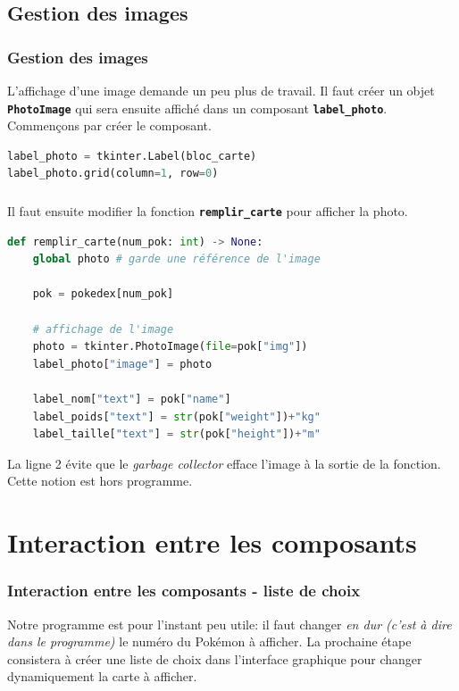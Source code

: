 \documentclass[svgnames,11pt]{beamer}
\begin{document}
\subsection{Gestion des images}
\begin{frame}[fragile]
    \frametitle{Gestion des images}

    L'affichage d'une image demande un peu plus de travail. Il faut créer un objet \textbf{\texttt{PhotoImage}} qui sera ensuite affiché dans un composant \textbf{\texttt{label\_photo}}. Commençons par créer le composant.
    \begin{center}
        \begin{lstlisting}[language=Python , basicstyle=\ttfamily\small, xleftmargin=1em, xrightmargin=1em]
label_photo = tkinter.Label(bloc_carte)
label_photo.grid(column=1, row=0)  
\end{lstlisting}
        \label{CODE}
    \end{center}

\end{frame}

\begin{frame}[fragile]
    \frametitle{}

    Il faut ensuite modifier la fonction \textbf{\texttt{remplir\_carte}} pour afficher la photo.

    \begin{center}
        \begin{lstlisting}[language=Python , basicstyle=\ttfamily\small, xleftmargin=1em, xrightmargin=1em]
def remplir_carte(num_pok: int) -> None:
    global photo # garde une référence de l'image

    pok = pokedex[num_pok]

    # affichage de l'image
    photo = tkinter.PhotoImage(file=pok["img"])
    label_photo["image"] = photo

    label_nom["text"] = pok["name"]
    label_poids["text"] = str(pok["weight"])+"kg"
    label_taille["text"] = str(pok["height"])+"m"
\end{lstlisting}
    \end{center}
    \begin{aretenir}[Commentaire]
        La ligne 2 évite que le \emph{garbage collector} efface l'image à la sortie de la fonction. Cette notion est hors programme.
    \end{aretenir}
\end{frame}
\section{Interaction entre les composants}
\begin{frame}
    \frametitle{Interaction entre les composants - liste de choix}

    Notre programme est pour l'instant peu utile: il faut changer \emph{en dur (c'est à dire dans le programme)} le numéro du Pokémon à afficher. La prochaine étape consistera à créer une liste de choix dans l'interface graphique pour changer dynamiquement la carte à afficher.


\end{frame}
\end{document}
